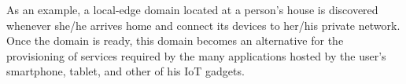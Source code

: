 As an example, a local-edge domain located at a person's house is discovered whenever she/he arrives home and connect its devices to her/his private network. Once the domain is ready, this domain becomes an alternative for the provisioning of services required by the many applications hosted by the user's smartphone, tablet, and other of his IoT gadgets. %






%


%
%
	
